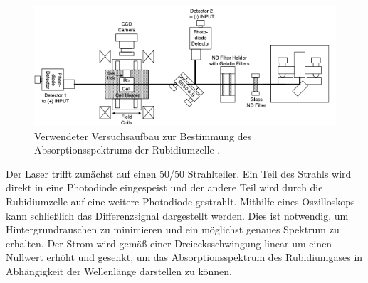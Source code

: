 \begin{figure}
    \centering
    \includegraphics[width=\textwidth]{bilder/Aufbau.png}
    \caption{Verwendeter Versuchsaufbau zur Bestimmung des Absorptionsspektrums der Rubidiumzelle \cite{diode_laser_spectroscopy}.}
    \label{fig:Aufbau_rub}
\end{figure}

Der Laser trifft zunächst auf einen 50/50 Strahlteiler. Ein Teil des Strahls wird direkt in eine Photodiode eingespeist und der andere Teil wird durch die Rubidiumzelle auf eine
weitere Photodiode gestrahlt. Mithilfe eines Oszilloskops kann schließlich das Differenzsignal dargestellt werden. Dies ist notwendig, um Hintergrundrauschen zu minimieren und ein möglichst 
genaues Spektrum zu erhalten. Der Strom wird gemäß einer Dreiecksschwingung linear um einen Nullwert erhöht und gesenkt, um das Absorptionsspektrum des Rubidiumgases in Abhängigkeit
der Wellenlänge darstellen zu können.
